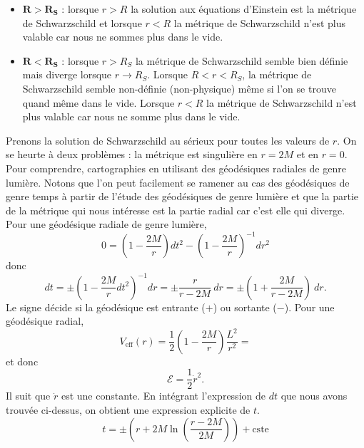 \documentclass[a4paper,11pt]{report}
\begin{document}
            \begin{itemize}[label = \textbullet]
                \item $\boldsymbol{R>R_S}$ : lorsque $r>R$ la solution aux équations d'Einstein est la métrique de Schwarzschild et lorsque $r<R$ la métrique de Schwarzschild n'est plus valable car nous ne sommes plus dans le vide.
                \item $\boldsymbol{R<R_S}$ : lorsque $r>R_S$ la métrique de Schwarzschild semble bien définie mais diverge lorsque $r\to R_S$. Lorsque $R<r<R_S$, la métrique de Schwarzschild semble non-définie (non-physique) même si l'on se trouve quand même dans le vide. Lorsque $r<R$ la métrique de Schwarzschild n'est plus valable car nous ne somme plus dans le vide.
                \comp
            \end{itemize}
            
            Prenons la solution de Schwarzschild au sérieux pour toutes les valeurs de $r$. On se heurte à deux problèmes : la métrique est singulière en $r=2M$ et en $r=0$. Pour comprendre, cartographies en utilisant des géodésiques radiales de genre lumière. Notons que l'on peut facilement se ramener au cas des géodésiques de genre temps à partir de l'étude des géodésiques de genre lumière et que la partie de la métrique qui nous intéresse est la partie radial car c'est elle qui diverge. Pour une géodésique radiale de genre lumière,
            \begin{equation}
                0 = \left( 1-\frac{2M}{r} \right)dt^2 - \left( 1-\frac{2M}{r} \right)^{-1}dr^2
            \end{equation}
            donc
            \begin{equation}
                 dt = \pm \left( 1-\frac{2M}{r}dt^2 \right)^{-1} dr = \pm \frac{r}{r-2M}~dr = \pm\left( 1+\frac{2M}{r-2M} \right)~dr.
            \end{equation}
            Le signe décide si la géodésique est entrante ($+$) ou sortante ($-$). Pour une géodésique radial, 
            \begin{equation}
                V_{\text{eff}}(r) = \frac{1}{2}\left( 1-\frac{2M}{r} \right)\frac{L^2}{r^2} = 
            \end{equation}
            et donc
            \begin{equation}
                \mathscr{E} = \frac{1}{2}\dot{r}^2.
            \end{equation}
            Il suit que $\dot{r}$ est une constante. En intégrant l'expression de $dt$ que nous avons trouvée ci-dessus, on obtient une expression explicite de $t$.
            \begin{equation}
                t = \pm\left( r+2M\ln\left( \frac{r-2M}{2M} \right) \right) +  \text{cste}
            \end{equation}
            
\end{document}
